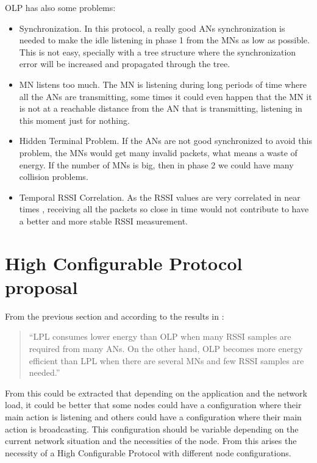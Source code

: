 \ac{OLP} has also some problems:

\begin{itemize}
 \item Synchronization. In this protocol, a really good \acp{AN} synchronization is needed to make the idle listening in phase 1 from the 
\acp{MN} as low as possible. This is not easy, specially with a tree structure where the synchronization error will be increased and 
propagated through the tree.
 \item \ac{MN} listens too much. The \ac{MN} is listening during long periods of time where all the \acp{AN} are transmitting, some times it
could even happen that the \ac{MN} it is not at a reachable distance from the \ac{AN} that is transmitting, listening in this moment just 
for nothing.
 \item Hidden Terminal Problem. If the \acp{AN} are not good synchronized to avoid this problem, the \acp{MN} would get many invalid 
packets, what means a waste of energy. If the number of \acp{MN} is big, then in phase 2 we could have many collision problems.
 \item Temporal \ac{RSSI} Correlation. As the \ac{RSSI} values are very correlated in near times \cite{RSSIcorrelated}, receiving all 
the packets so close in time would not contribute to have a better and more stable \ac{RSSI} measurement.
\end{itemize}
 

\section{High Configurable Protocol proposal}
\label{sec:ProtocolDescription}

From the previous section and according to the results in \cite{LPLandOLP}:
\begin{quote}
``LPL consumes lower energy than OLP when many RSSI samples are required from many ANs. On the other hand,
OLP becomes more energy efficient than LPL when there are several MNs and few RSSI samples are needed.''\cite{LPLandOLP}
\end{quote}

From this could be extracted that depending on the application and the network load, it could be better that some nodes could have a 
configuration where their main action is listening and others could have a configuration where their main action is broadcasting. This 
configuration should be variable depending on the current network situation and the necessities of the node. From this arises the necessity
of a High Configurable Protocol with different node configurations.

